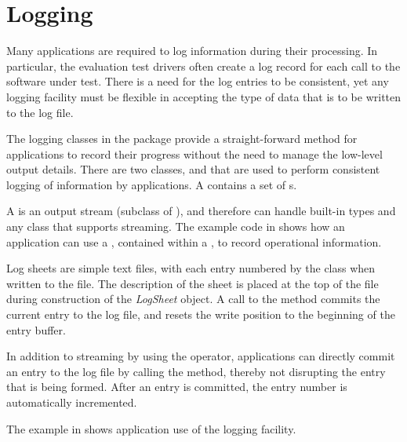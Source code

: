 \section{Logging}
\label{sec-logging}

Many applications are required to log information during their processing. In
particular, the evaluation test drivers often create a log record for each
call to the software under test. There is a need for the log entries to be
consistent, yet any logging facility must be flexible in accepting the type of
data that is to be written to the log file.

The logging classes in the  package provide a straight-forward method
for applications to record their progress without the need to manage the
low-level output details.
There are two classes,  and  that are used
to perform consistent logging of information by applications. A 
contains a set of s.

A  is an output stream (subclass of ),
and therefore can handle built-in types and any class that supports streaming.
The example code in  shows how an application can use 
a , contained within a , to record operational
information.

Log sheets are simple text files, with each entry numbered by the 
class when written to the file. The description of the sheet is placed at the
top of the file during construction of the {\em LogSheet} object. A call to the
 method commits the current entry to the log file, and resets
the write position to the beginning of the entry buffer.

In addition to streaming by using the  operator, applications
can directly commit an entry to the log file by calling the 
method, thereby not disrupting the entry that is being formed. After an entry
is committed, the entry number is automatically incremented.

The example in  shows application use of the
logging facility.

